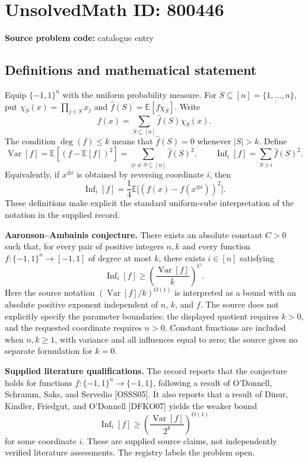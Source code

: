 \documentclass[11pt]{article}
\newcommand{\E}{\mathbb{E}}
\begin{document}
\section*{UnsolvedMath ID: 800446}
\textbf{Source problem code:} catalogue entry
\subsection{Definitions and mathematical statement}
Equip \(\{-1,1\}^n\) with the uniform probability measure. For \(S\subseteq[n]=\{1,\ldots,n\}\), put \(\chi_S(x)=\prod_{j\in S}x_j\) and \(\widehat f(S)=\E[f\chi_S]\). Write
\[
f(x)=\sum_{S\subseteq[n]}\widehat f(S)\chi_S(x).
\]
The condition \(\deg(f)\leq k\) means that \(\widehat f(S)=0\) whenever \(|S|>k\). Define
\[
\operatorname{Var}[f]=\E[(f-\E[f])^2]
=\sum_{\varnothing\ne S\subseteq[n]}\widehat f(S)^2,
\qquad
\operatorname{Inf}_i[f]=\sum_{S\ni i}\widehat f(S)^2.
\]
Equivalently, if \(x^{\oplus i}\) is obtained by reversing coordinate \(i\), then
\[
\operatorname{Inf}_i[f]=\frac14\E\bigl[(f(x)-f(x^{\oplus i}))^2\bigr].
\]
These definitions make explicit the standard uniform-cube interpretation of the notation in the supplied record.

\textbf{Aaronson--Ambainis conjecture.} There exists an absolute constant \(C>0\) such that, for every pair of positive integers \(n,k\) and every function \(f:\{-1,1\}^n\to[-1,1]\) of degree at most \(k\), there exists \(i\in[n]\) satisfying
\[
\operatorname{Inf}_i[f]\geq
\left(\frac{\operatorname{Var}[f]}{k}\right)^C.
\]
Here the source notation \((\operatorname{Var}[f]/k)^{O(1)}\) is interpreted as a bound with an absolute positive exponent independent of \(n\), \(k\), and \(f\). The source does not explicitly specify the parameter boundaries: the displayed quotient requires \(k>0\), and the requested coordinate requires \(n>0\). Constant functions are included when \(n,k\geq1\), with variance and all influences equal to zero; the source gives no separate formulation for \(k=0\).

\textbf{Supplied literature qualifications.} The record reports that the conjecture holds for functions \(f:\{-1,1\}^n\to\{-1,1\}\), following a result of O'Donnell, Schramm, Saks, and Servedio [OSSS05]. It also reports that a result of Dinur, Kindler, Friedgut, and O'Donnell [DFKO07] yields the weaker bound
\[
\operatorname{Inf}_i[f]\geq
\left(\frac{\operatorname{Var}[f]}{2^k}\right)^{O(1)}
\]
for some coordinate \(i\). These are supplied source claims, not independently verified literature assessments. The registry labels the problem open.
\end{document}
